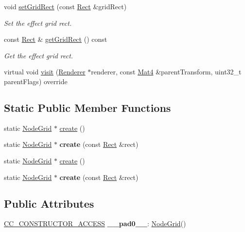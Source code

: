 \begin{DoxyCompactItemize}
\item 
void \hyperlink{classNodeGrid_adf29e6e9db43eaf8fd6156795e6e4286}{set\+Grid\+Rect} (const \hyperlink{classRect}{Rect} \&grid\+Rect)
\begin{DoxyCompactList}\small\item\em Set the effect grid rect. \end{DoxyCompactList}\item 
const \hyperlink{classRect}{Rect} \& \hyperlink{classNodeGrid_a8116f72215e420c5d075a590a53d24a3}{get\+Grid\+Rect} () const
\begin{DoxyCompactList}\small\item\em Get the effect grid rect. \end{DoxyCompactList}\item 
virtual void \hyperlink{classNodeGrid_accaa8bcbf32f1d9e2b62ae0103ff5169}{visit} (\hyperlink{classRenderer}{Renderer} $\ast$renderer, const \hyperlink{classMat4}{Mat4} \&parent\+Transform, uint32\+\_\+t parent\+Flags) override
\end{DoxyCompactItemize}
\subsection*{Static Public Member Functions}
\begin{DoxyCompactItemize}
\item 
static \hyperlink{classNodeGrid}{Node\+Grid} $\ast$ \hyperlink{classNodeGrid_a9d8226f4e0568774109ddc36f8f3bef3}{create} ()
\item 
\mbox{\label{classNodeGrid_a378bf16b8ee9c509a3e631916aa74279}} 
static \hyperlink{classNodeGrid}{Node\+Grid} $\ast$ {\bfseries create} (const \hyperlink{classRect}{Rect} \&rect)
\item 
static \hyperlink{classNodeGrid}{Node\+Grid} $\ast$ \hyperlink{classNodeGrid_a7935b1f30d51ed7def0be83b4cab5dff}{create} ()
\item 
\mbox{\label{classNodeGrid_a378bf16b8ee9c509a3e631916aa74279}} 
static \hyperlink{classNodeGrid}{Node\+Grid} $\ast$ {\bfseries create} (const \hyperlink{classRect}{Rect} \&rect)
\end{DoxyCompactItemize}
\subsection*{Public Attributes}
\begin{DoxyCompactItemize}
\item 
\mbox{\label{classNodeGrid_a50e4eac13ed5c6e0ef8d6167d56dbb4b}} 
\hyperlink{_2cocos2d_2cocos_2base_2ccConfig_8h_a25ef1314f97c35a2ed3d029b0ead6da0}{C\+C\+\_\+\+C\+O\+N\+S\+T\+R\+U\+C\+T\+O\+R\+\_\+\+A\+C\+C\+E\+SS} {\bfseries \+\_\+\+\_\+pad0\+\_\+\+\_\+}\+: \hyperlink{classNodeGrid}{Node\+Grid}()
\end{DoxyCompactItemize}

